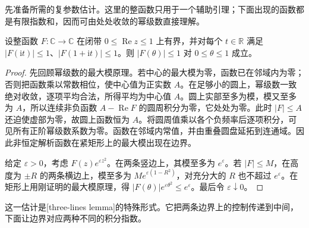 先准备所需的复参数估计。这里的整函数只用于一个辅助引理；下面出现的函数都是有限指数和，因而可由处处收敛的幂级数直接理解。

\begin{lemma}[三线引理的有界形式]\label{b2:lem:04-three-lines}
设整函数 \(F:\mathbb C\to\mathbb C\) 在闭带 \(0\leq\operatorname{Re}z\leq1\) 上有界，并对每个 \(t\in\mathbb R\) 满足 \(|F(\mathrm{i}t)|\leq1\)、\(|F(1+\mathrm{i}t)|\leq1\)。则 \(|F(\theta)|\leq1\) 对 \(0\leq\theta\leq1\) 成立。
\end{lemma}
\begin{proof}
先回顾幂级数的最大模原理。若中心的最大模为零，函数已在邻域内为零；否则把函数乘以常数相位，使中心值为正实数 \(A\)。在足够小的圆上，幂级数一致绝对收敛，逐项平均合法，所得平均为中心值 \(A\)。圆上实部至多为模，模又至多为 \(A\)，所以连续非负函数 \(A-\operatorname{Re}F\) 的圆周积分为零，它处处为零。此时 \(|F|\leq A\) 还迫使虚部为零，故圆上函数恒为 \(A\)。将圆周值乘以各个负频率后逐项积分，可见所有正阶幂级数系数为零。函数在邻域内常值，并由重叠圆盘延拓到连通域。因此非恒定解析函数在紧矩形上的最大模出现在边界。

给定 \(\varepsilon>0\)，考虑 \(F(z)e^{\varepsilon z^2}\)。在两条竖边上，其模至多为 \(e^\varepsilon\)。若 \(|F|\leq M\)，在高度为 \(\pm R\) 的两条横边上，模至多为 \(Me^{\varepsilon(1-R^2)}\)，对充分大的 \(R\) 也不超过 \(e^\varepsilon\)。在矩形上用刚证明的最大模原理，得 \(|F(\theta)|e^{\varepsilon\theta^2}\leq e^\varepsilon\)。最后令 \(\varepsilon\downarrow0\)。
\end{proof}

这一估计是[three-lines lemma]的特殊形式。它把两条边界上的控制传递到中间，下面让边界对应两种不同的积分指数。

